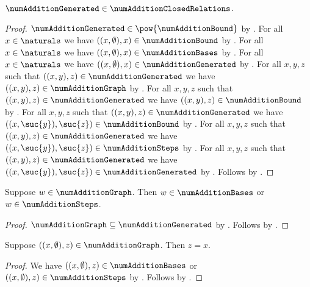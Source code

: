 \begin{proposition}\label{num_addition_generated_closed}
    $\numAdditionGenerated\in\numAdditionClosedRelations$.
\end{proposition}
\begin{proof}
    $\numAdditionGenerated\in\pow{\numAdditionBound}$
        by .
    For all $x\in\naturals$ we have
        $((x,\emptyset),x)\in\numAdditionBound$
        by .
    For all $x\in\naturals$ we have
        $((x,\emptyset),x)\in\numAdditionBases$
        by .
    For all $x\in\naturals$ we have
        $((x,\emptyset),x)\in\numAdditionGenerated$
        by .
    For all $x,y,z$ such that
        $((x,y),z)\in\numAdditionGenerated$ we have
        $((x,y),z)\in\numAdditionGraph$
        by .
    For all $x,y,z$ such that
        $((x,y),z)\in\numAdditionGenerated$ we have
        $((x,y),z)\in\numAdditionBound$
        by .
    For all $x,y,z$ such that
        $((x,y),z)\in\numAdditionGenerated$ we have
        $((x,\suc{y}),\suc{z})\in\numAdditionBound$
        by .
    For all $x,y,z$ such that
        $((x,y),z)\in\numAdditionGenerated$ we have
        $((x,\suc{y}),\suc{z})\in\numAdditionSteps$
        by .
    For all $x,y,z$ such that
        $((x,y),z)\in\numAdditionGenerated$ we have
        $((x,\suc{y}),\suc{z})\in\numAdditionGenerated$
        by .
    Follows by .
\end{proof}

\begin{proposition}\label{num_addition_graph_cases}
    Suppose $w\in\numAdditionGraph$.
    Then $w\in\numAdditionBases$ or $w\in\numAdditionSteps$.
\end{proposition}
\begin{proof}
    $\numAdditionGraph\subseteq\numAdditionGenerated$
        by .
    Follows by .
\end{proof}

\begin{proposition}\label{num_addition_graph_zero_elim}
    Suppose $((x,\emptyset),z)\in\numAdditionGraph$.
    Then $z=x$.
\end{proposition}
\begin{proof}
    We have $((x,\emptyset),z)\in\numAdditionBases$ or
        $((x,\emptyset),z)\in\numAdditionSteps$
        by .
    Follows by .
\end{proof}

